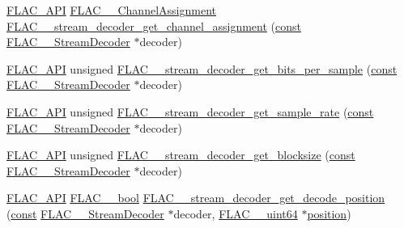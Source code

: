 \begin{DoxyCompactItemize}
\item 
\hyperlink{group__flac__export_ga56ca07df8a23310707732b1c0007d6f5}{F\+L\+A\+C\+\_\+\+A\+PI} \hyperlink{group__flac__format_ga79855f8525672e37f299bbe02952ef9c}{F\+L\+A\+C\+\_\+\+\_\+\+Channel\+Assignment} \hyperlink{group__flac__stream__decoder_gad7906d840eef5c15ef5c8fe4571d1172}{F\+L\+A\+C\+\_\+\+\_\+stream\+\_\+decoder\+\_\+get\+\_\+channel\+\_\+assignment} (\hyperlink{getopt1_8c_a2c212835823e3c54a8ab6d95c652660e}{const} \hyperlink{struct_f_l_a_c_____stream_decoder}{F\+L\+A\+C\+\_\+\+\_\+\+Stream\+Decoder} $\ast$decoder)
\item 
\hyperlink{group__flac__export_ga56ca07df8a23310707732b1c0007d6f5}{F\+L\+A\+C\+\_\+\+A\+PI} unsigned \hyperlink{group__flac__stream__decoder_ga2e4bae93f2ebf49babd88bb5fe54bd24}{F\+L\+A\+C\+\_\+\+\_\+stream\+\_\+decoder\+\_\+get\+\_\+bits\+\_\+per\+\_\+sample} (\hyperlink{getopt1_8c_a2c212835823e3c54a8ab6d95c652660e}{const} \hyperlink{struct_f_l_a_c_____stream_decoder}{F\+L\+A\+C\+\_\+\+\_\+\+Stream\+Decoder} $\ast$decoder)
\item 
\hyperlink{group__flac__export_ga56ca07df8a23310707732b1c0007d6f5}{F\+L\+A\+C\+\_\+\+A\+PI} unsigned \hyperlink{group__flac__stream__decoder_ga83f1359028e0646c1e50c1aef0d9fd6d}{F\+L\+A\+C\+\_\+\+\_\+stream\+\_\+decoder\+\_\+get\+\_\+sample\+\_\+rate} (\hyperlink{getopt1_8c_a2c212835823e3c54a8ab6d95c652660e}{const} \hyperlink{struct_f_l_a_c_____stream_decoder}{F\+L\+A\+C\+\_\+\+\_\+\+Stream\+Decoder} $\ast$decoder)
\item 
\hyperlink{group__flac__export_ga56ca07df8a23310707732b1c0007d6f5}{F\+L\+A\+C\+\_\+\+A\+PI} unsigned \hyperlink{group__flac__stream__decoder_ga9cd4807f4c6ee90338d271048fb28223}{F\+L\+A\+C\+\_\+\+\_\+stream\+\_\+decoder\+\_\+get\+\_\+blocksize} (\hyperlink{getopt1_8c_a2c212835823e3c54a8ab6d95c652660e}{const} \hyperlink{struct_f_l_a_c_____stream_decoder}{F\+L\+A\+C\+\_\+\+\_\+\+Stream\+Decoder} $\ast$decoder)
\item 
\hyperlink{group__flac__export_ga56ca07df8a23310707732b1c0007d6f5}{F\+L\+A\+C\+\_\+\+A\+PI} \hyperlink{ordinals_8h_a95103469f1cbd78b8cf250194985b34e}{F\+L\+A\+C\+\_\+\+\_\+bool} \hyperlink{group__flac__stream__decoder_ga11507d25b6fdbd1efd5ee642923730fa}{F\+L\+A\+C\+\_\+\+\_\+stream\+\_\+decoder\+\_\+get\+\_\+decode\+\_\+position} (\hyperlink{getopt1_8c_a2c212835823e3c54a8ab6d95c652660e}{const} \hyperlink{struct_f_l_a_c_____stream_decoder}{F\+L\+A\+C\+\_\+\+\_\+\+Stream\+Decoder} $\ast$decoder, \hyperlink{ordinals_8h_aa78c8c70a3eb8a58af7436f278acde8e}{F\+L\+A\+C\+\_\+\+\_\+uint64} $\ast$\hyperlink{structposition}{position})

\end{DoxyCompactItemize}
